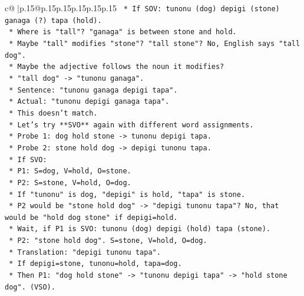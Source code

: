 \documentclass{article}
\begin{document}
{\begin{supertabular}{c@{$\;$}|p{.15\linewidth}@{}p{.15\linewidth}p{.15\linewidth}p{.15\linewidth}p{.15\linewidth}p{.15\linewidth}}
{{{\texttt{                        *   If SOV: tunonu (dog) depigi (stone) ganaga (?) tapa (hold).} \\
\texttt{                        *   Where is "tall"? "ganaga" is between stone and hold.} \\
\texttt{                        *   Maybe "tall" modifies "stone"? "tall stone"? No, English says "tall dog".} \\
\texttt{                        *   Maybe the adjective follows the noun it modifies?} \\
\texttt{                            *   "tall dog" {-}> "tunonu ganaga".} \\
\texttt{                            *   Sentence: "tunonu ganaga depigi tapa".} \\
\texttt{                            *   Actual: "tunonu depigi ganaga tapa".} \\
\texttt{                            *   This doesn't match.} \\
\texttt{                    *   Let's try **SVO** again with different word assignments.} \\
\texttt{                        *   Probe 1: dog hold stone {-}> tunonu depigi tapa.} \\
\texttt{                        *   Probe 2: stone hold dog {-}> depigi tunonu tapa.} \\
\texttt{                        *   If SVO:} \\
\texttt{                            *   P1: S=dog, V=hold, O=stone.} \\
\texttt{                            *   P2: S=stone, V=hold, O=dog.} \\
\texttt{                            *   If "tunonu" is dog, "depigi" is hold, "tapa" is stone.} \\
\texttt{                            *   P2 would be "stone hold dog" {-}> "depigi tunonu tapa"? No, that would be "hold dog stone" if depigi=hold.} \\
\texttt{                            *   Wait, if P1 is SVO: tunonu (dog) depigi (hold) tapa (stone).} \\
\texttt{                            *   P2: "stone hold dog". S=stone, V=hold, O=dog.} \\
\texttt{                            *   Translation: "depigi tunonu tapa".} \\
\texttt{                            *   If depigi=stone, tunonu=hold, tapa=dog.} \\
\texttt{                            *   Then P1: "dog hold stone" {-}> "tunonu depigi tapa" {-}> "hold stone dog". (VSO).} \\
}}}
\end{supertabular}}
\end{document}
